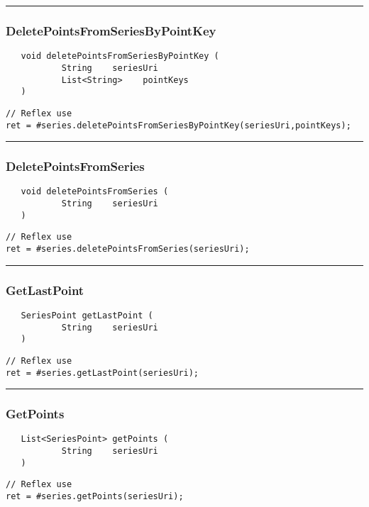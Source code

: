 \rule{15cm}{2pt}
\subsubsection{DeletePointsFromSeriesByPointKey}
\label{Api:DeletePointsFromSeriesByPointKey}
\begin{verbatim}
   void deletePointsFromSeriesByPointKey (
           String    seriesUri
           List<String>    pointKeys
   )
\end{verbatim}
\begin{lstlisting}[language=reflex]
// Reflex use
ret = #series.deletePointsFromSeriesByPointKey(seriesUri,pointKeys);
\end{lstlisting}



\rule{15cm}{2pt}
\subsubsection{DeletePointsFromSeries}
\label{Api:DeletePointsFromSeries}
\begin{verbatim}
   void deletePointsFromSeries (
           String    seriesUri
   )
\end{verbatim}
\begin{lstlisting}[language=reflex]
// Reflex use
ret = #series.deletePointsFromSeries(seriesUri);
\end{lstlisting}



\rule{15cm}{2pt}
\subsubsection{GetLastPoint}
\label{Api:GetLastPoint}
\begin{verbatim}
   SeriesPoint getLastPoint (
           String    seriesUri
   )
\end{verbatim}
\begin{lstlisting}[language=reflex]
// Reflex use
ret = #series.getLastPoint(seriesUri);
\end{lstlisting}



\rule{15cm}{2pt}
\subsubsection{GetPoints}
\label{Api:GetPoints}
\begin{verbatim}
   List<SeriesPoint> getPoints (
           String    seriesUri
   )
\end{verbatim}
\begin{lstlisting}[language=reflex]
// Reflex use
ret = #series.getPoints(seriesUri);
\end{lstlisting}



